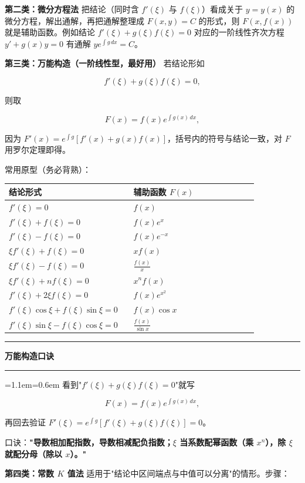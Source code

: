 \documentclass[11pt,openany,UTF8]{ctexbook}
\newcommand{\callouthead}[2]{%
  \par\addvspace{7pt}\noindent
  {\color{#1}\rule[-0.15em]{3pt}{1.05em}}\hspace{0.5em}%
  {\bfseries\color{#1}#2}\par\nobreak\vspace{-0.35em}%
  {\color{rulesep}\hrule height 0.4pt}\nobreak\vspace{0.45em}%
  \begingroup\small\setlength{\parindent}{0pt}%
  \leftskip=1.1em\rightskip=0.6em\noindent\ignorespaces}
\newcommand{\calloutend}{\par\endgroup\addvspace{7pt}}
\newenvironment{callkey}[1]{\callouthead{keybar}{#1}}{\calloutend}
\begin{document}
\textbf{第二类：微分方程法} 把结论（同时含 $f'(\xi)$ 与 $f(\xi)$）看成关于 $y=y(x)$ 的微分方程，解出通解，再把通解整理成 $F(x,y)=C$ 的形式，则 $F(x,f(x))$ 就是辅助函数。例如结论 $f'(\xi)+g(\xi)f(\xi)=0$ 对应的一阶线性齐次方程 $y'+g(x)y=0$ 有通解 $ye^{\int g\,dx}=C$。

\textbf{第三类：万能构造（一阶线性型，最好用）} 若结论形如

\[f'(\xi)+g(\xi)f(\xi)=0,\]

则取

\[F(x)=f(x)e^{\int g(x)\,dx},\]

因为 $F'(x)=e^{\int g}\left[f'(x)+g(x)f(x)\right]$，括号内的符号与结论一致，对 $F$ 用罗尔定理即得。

常用原型（务必背熟）：

\begingroup\small\setlength{\tabcolsep}{4.0pt}
\begin{longtable}{@{}L{0.4728\linewidth}L{0.4728\linewidth}@{}}
\toprule
\textbf{结论形式} & \textbf{辅助函数 $F(x)$} \\
\midrule
\endhead
$f'(\xi)=0$ & $f(x)$ \\
$f'(\xi)+f(\xi)=0$ & $f(x)e^{x}$ \\
$f'(\xi)-f(\xi)=0$ & $f(x)e^{-x}$ \\
$\xi f'(\xi)+f(\xi)=0$ & $xf(x)$ \\
$\xi f'(\xi)-f(\xi)=0$ & $\frac{f(x)}{x}$ \\
$\xi f'(\xi)+nf(\xi)=0$ & $x^nf(x)$ \\
$f'(\xi)+2\xi f(\xi)=0$ & $f(x)e^{x^2}$ \\
$f'(\xi)\cos\xi+f(\xi)\sin\xi=0$ & $f(x)\cos x$ \\
$f'(\xi)\sin\xi-f(\xi)\cos\xi=0$ & $\frac{f(x)}{\sin x}$ \\
\bottomrule
\end{longtable}
\endgroup

\begin{callkey}{万能构造口诀}
看到"$f'(\xi)+g(\xi)f(\xi)=0$"就写

\[F(x)=f(x)e^{\int g(x)\,dx},\]

再回去验证 $F'(\xi)=e^{\int g}\left[f'(\xi)+g(\xi)f(\xi)\right]=0$。

口诀：\textbf{"导数相加配指数，导数相减配负指数；$\xi$ 当系数配幂函数（乘 $x^n$），除 $\xi$ 就配分母（除以 $x$）。"}

\end{callkey}

\textbf{第四类：常数 $K$ 值法} 适用于"结论中区间端点与中值可以分离"的情形。步骤：
\end{document}

